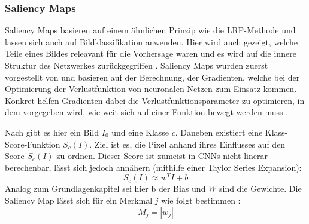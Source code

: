 \subsubsection{Saliency Maps}
Saliency Maps basieren auf einem ähnlichen Prinzip wie die LRP-Methode und lassen sich auch auf Bildklassifikation anwenden. Hier wird auch gezeigt, welche Teile eines Bildes releavant für die Vorhersage waren und es wird auf die innere Struktur des Netzwerkes zurückgegriffen \cite{Gianfagna.2021}.
Saliency Maps wurden zuerst vorgestellt von \cite{simonyan2013deep} und basieren auf der Berechnung, der Gradienten, welche bei der Optimierung der Verlustfunktion von neuronalen Netzen zum Einsatz kommen. Konkret helfen Gradienten dabei die Verlustfunktionsparameter zu optimieren, in dem vorgegeben wird, wie weit sich auf einer Funktion bewegt werden muss \cite{molnar2022}.

Nach \textcite{simonyan2013deep} gibt es hier ein Bild $I_{0}$ und eine Klasse $c$. Daneben existiert eine Klass-Score-Funktion $S_{c}(I)$. Ziel ist es, die Pixel anhand ihres Einflusses auf den Score $S_{c}(I)$ zu ordnen. Dieser Score ist zumeist in CNNs nicht linerar berechenbar, lässt sich jedoch annähern (mithilfe einer Taylor Series Expansion):
\begin{equation}
    S_{c}(I) \approx w^{T}I+b
\end{equation}
Analog zum Grundlagenkapitel sei hier b der Bias und $W$ sind die Gewichte. Die Saliency Map lässt sich für ein Merkmal $j$ wie folgt bestimmen \cite{kamath2021explainable}: 
\begin{equation}
    M_{j} = |w_{j}|
\end{equation}

